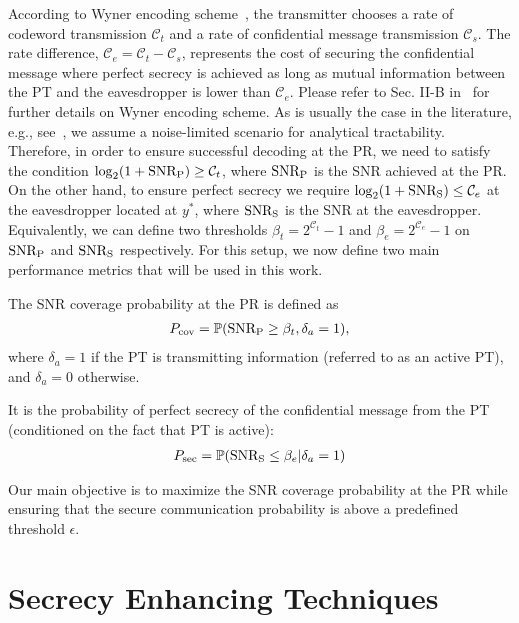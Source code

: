 \documentclass[final]{IEEEtran}
\begin{document}
According to Wyner encoding scheme~\cite{6772207}, the transmitter chooses a rate of codeword transmission $\mathcal{C}_t$ and a rate of confidential message transmission $\mathcal{C}_s$. The rate difference, $\mathcal{C}_e=\mathcal{C}_t-\mathcal{C}_s$, represents the cost of securing the confidential message where perfect secrecy is achieved as long as mutual information between the PT and the eavesdropper is lower than $\mathcal{C}_e$. Please refer to Sec. II-B in~\cite{4802331} for further details on Wyner encoding scheme. As is usually the case in the literature, e.g., see~\cite{7247765}, we assume a noise-limited scenario for analytical tractability. Therefore, in order to ensure successful decoding at the PR, we need to satisfy the condition $\log_2(1+{\rm SNR_P})\geq\mathcal{C}_t$, where ${\rm SNR_{P}}$ is the SNR achieved at the PR. On the other hand, to ensure perfect secrecy we require $\log_2(1+{\rm SNR_S})\leq\mathcal{C}_e$ at the eavesdropper located at $y^{*}$, where ${\rm SNR_{S}}$ is the SNR at the eavesdropper. Equivalently, we can define two thresholds $\beta_t=2^{\mathcal{C}_t}-1$ and $\beta_e=2^{\mathcal{C}_e}-1$ on ${\rm SNR_P}$ and ${\rm SNR_S}$ respectively. For this setup, we now define two main performance metrics that will be used in this work.%
\begin{definition} \label{def:1}
The SNR coverage probability at the PR is defined as 
\begin{align}
P_{\rm cov}=\mathbb{P}({\rm SNR_P}\geq\beta_t,\delta_a=1),
\end{align}
where $\delta_a=1$ if the PT is transmitting information (referred to as an active PT), and $\delta_a=0$ otherwise. 
\end{definition}
\begin{definition} \label{def:2}
It is the probability of perfect secrecy of the confidential message from the PT (conditioned on the fact that PT is active): 
\begin{align}
P_{\rm sec}=\mathbb{P}({\rm SNR_S}\leq\beta_e|\delta_a=1)
\end{align}
\end{definition}
Our main objective is to maximize the SNR coverage probability at the PR while ensuring that the secure communication probability is above a predefined threshold $\epsilon$. 
\vspace{-4mm}
\section{Secrecy Enhancing Techniques}
\end{document}
